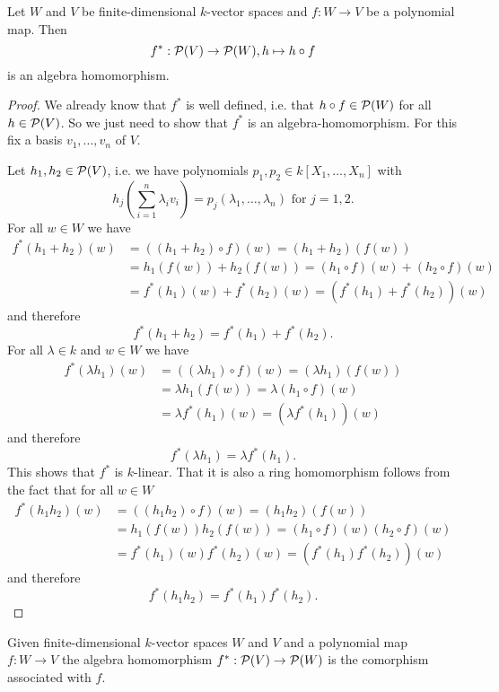 \begin{lem}
 Let $W$ and $V$ be finite-dimensional $k$-vector spaces and $f : W \to V$ be a polynomial map. Then
 \[
  f^* : \mathcal{P}(V) \to \mathcal{P}(W), h \mapsto h \circ f
 \]
 is an algebra homomorphism.
\end{lem}
\begin{proof}
 We already know that $f^*$ is well defined, i.e. that $h \circ f \in \mathcal{P}(W)$ for all $h \in \mathcal{P}(V)$. So we just need to show that $f^*$ is an algebra-homomorphism. For this fix a basis $v_1, \ldots, v_n$ of $V$.
 
 Let $h_1, h_2\in \mathcal{P}(V)$, i.e. we have polynomials $p_1, p_2\in k[X_1, \ldots, X_n]$ with
 \[
  h_j\left(\sum_{i=1}^n \lambda_i v_i\right) = p_j(\lambda_1, \ldots, \lambda_n) \text{ for } j=1,2.
 \]
 For all $w \in W$ we have
 \begin{align*}
  f^*(h_1+h_2)(w)
  &= ((h_1 + h_2) \circ f)(w)
  = (h_1 + h_2)(f(w)) \\
  &= h_1(f(w)) + h_2(f(w))
  = (h_1 \circ f)(w) + (h_2 \circ f)(w) \\
  &= f^*(h_1)(w) + f^*(h_2)(w)
  = (f^*(h_1)+f^*(h_2))(w)
 \end{align*}
 and therefore
 \[
  f^*(h_1+h_2) = f^*(h_1) + f^*(h_2).
 \]
 For all $\lambda \in k$ and $w \in W$ we have
 \begin{align*}
  f^*(\lambda h_1)(w)
  &= ((\lambda h_1) \circ f)(w)
  = (\lambda h_1)(f(w)) \\
  &= \lambda h_1(f(w))
  = \lambda (h_1 \circ f)(w) \\
  &= \lambda f^*(h_1)(w)
  = (\lambda f^*(h_1))(w)
 \end{align*}
 and therefore
 \[
  f^*(\lambda h_1) = \lambda f^*(h_1).
 \]
 This shows that $f^*$ is $k$-linear. That it is also a ring homomorphism follows from the fact that for all $w \in W$
 \begin{align*}
  f^*(h_1 h_2)(w)
  &= ((h_1 h_2) \circ f)(w)
  = (h_1 h_2)(f(w)) \\
  &= h_1(f(w)) h_2(f(w))
  = (h_1 \circ f)(w) (h_2 \circ f)(w) \\
  &= f^*(h_1)(w) f^*(h_2)(w)
  = (f^*(h_1) f^*(h_2))(w)
 \end{align*}
 and therefore
 \[
  f^*(h_1 h_2) = f^*(h_1) f^*(h_2).
 \]
\end{proof}


\begin{defi}
 Given finite-dimensional $k$-vector spaces $W$ and $V$ and a polynomial map $f : W \to V$ the algebra homomorphism $f^* : \mathcal{P}(V) \to \mathcal{P}(W)$ is the comorphism associated with $f$.
\end{defi}


